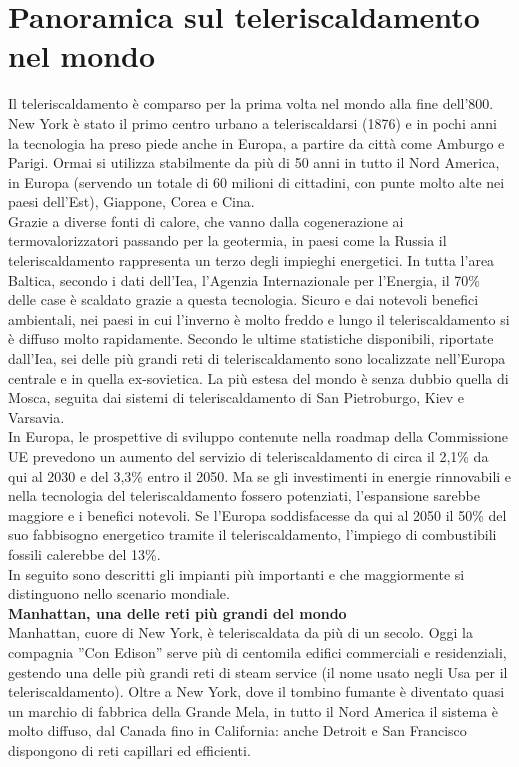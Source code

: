 \documentclass[laurea,oneside,11pt]{USiena_tesiLM}
\begin{document}
\section{Panoramica sul teleriscaldamento nel mondo}
Il teleriscaldamento è comparso per la prima volta nel mondo alla fine dell'800. New York è stato il primo centro urbano a teleriscaldarsi (1876) e in pochi anni la tecnologia ha preso piede anche in Europa, a partire da città come Amburgo e Parigi.
Ormai si utilizza stabilmente da più di 50 anni in tutto il Nord America, in Europa (servendo un totale di 60 milioni di cittadini, con punte molto alte nei paesi dell'Est), Giappone, Corea e Cina.\\

Grazie a diverse fonti di calore, che vanno dalla cogenerazione ai termovalorizzatori passando per la geotermia, in paesi come la Russia il teleriscaldamento rappresenta un terzo degli impieghi energetici. In tutta l'area Baltica, secondo i dati dell'Iea, l'Agenzia Internazionale per l'Energia, il 70\% delle case è scaldato grazie a questa tecnologia. Sicuro e dai notevoli benefici ambientali, nei paesi in cui l'inverno è molto freddo e lungo il teleriscaldamento si è diffuso molto rapidamente. Secondo le ultime statistiche disponibili, riportate dall'Iea, sei delle più grandi reti di teleriscaldamento sono localizzate nell'Europa centrale e in quella ex-sovietica. La più estesa del mondo è senza dubbio quella di Mosca, seguita dai sistemi di teleriscaldamento di San Pietroburgo, Kiev e Varsavia. \\

In Europa, le prospettive di sviluppo contenute nella roadmap della Commissione UE prevedono un aumento del servizio di teleriscaldamento di circa il 2,1\% da qui al 2030 e del 3,3\% entro il 2050. Ma se gli investimenti in energie rinnovabili e nella tecnologia del teleriscaldamento fossero potenziati, l'espansione sarebbe maggiore e i benefici notevoli. Se l'Europa soddisfacesse da qui al 2050 il 50\% del suo fabbisogno energetico tramite il teleriscaldamento, l'impiego di combustibili fossili calerebbe del 13\%.\\

In seguito sono descritti gli impianti più importanti e che maggiormente si distinguono nello scenario mondiale.\\

\noindent\textbf{Manhattan, una delle reti più grandi del mondo}\\
\noindent Manhattan, cuore di New York, è teleriscaldata da più di un secolo. Oggi la compagnia ''Con Edison'' serve più di centomila edifici commerciali e residenziali, gestendo una delle più grandi reti di steam service (il nome usato negli Usa per il teleriscaldamento). Oltre a New York, dove il tombino fumante è diventato quasi un marchio di fabbrica della Grande Mela, in tutto il Nord America il sistema è molto diffuso, dal Canada fino in California: anche Detroit e San Francisco dispongono di reti capillari ed efficienti.\\
\end{document}
